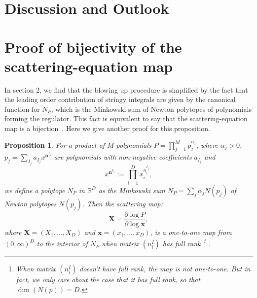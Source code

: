 \documentclass[12pt]{article}
\theoremstyle{definition}
\theoremstyle{plain}
\newtheorem*{pro*}{Proposition}
\begin{document}
\section{Discussion and Outlook}


\appendix

\section*{Proof of bijectivity of the scattering-equation map}
In section 2, we find that the blowing up procedure is simplified by the fact that the leading order contribution of stringy integrals are given by the canonical function for $N_{P}$, which is the Minkowski sum of Newton polytopes of polynomials forming the regulator. This fact is equivalent to say that the scattering-equation map is a bijection~\cite{}. Here we give another proof for this proposition. 

\begin{pro*}
	For a product of $M$ polynomials $P=\prod_{j=1}^M p_j^{\alpha_j}$, 
	where $\alpha_j>0$, 
	$p_j=\sum_{I_{j}} a_{{I_j}} x^{\mathbf{n}^{I_j}}$ are polynomials with non-negative coefficients $a_{I_j}$ and
	\[
		x^{\mathbf{n}^{I_j}}:=\prod_{i=1}^D x_i^{n^{I_j}_i},
	\]
	we define a polytope $N_P$ in $\mathbb R^D$ as the Minkowski sum $N_P=\sum_j \alpha_j N(p_j)$ of Newton polytopes $N(p_j)$.
	Then the scattering map:
	\[
		\mathbf{X}=\frac{\partial \log P}{\partial \log \mathbf{x}},
	\]
	where $\mathbf{X}=(X_{1},\ldots,X_{D})$ and $\mathbf{x}=(x_{1},\ldots,x_{D})$, is a one-to-one map from $(0,\infty)^D$ to the interior of $N_P$ when matrix $(n_i^I)$ has full rank%
	\footnote{When matrix $(n_i^I)$ doesn't have full rank, the map is not one-to-one. 
		But in fact, we only care about the case that it has full rank, so that $\dim (N(p))=D$. 
		}%
		. 
	\end{pro*}
	
\end{document}
